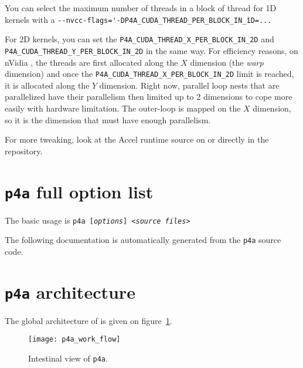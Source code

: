 \documentclass[a4paper]{article}
\begin{document}
You can select the maximum number of threads in a block of thread for 1D
kernels with a \verb|--nvcc-flags='-DP4A_CUDA_THREAD_PER_BLOCK_IN_1D=...|

For 2D kernels, you can set the \verb|P4A_CUDA_THREAD_X_PER_BLOCK_IN_2D|
and \verb|P4A_CUDA_THREAD_Y_PER_BLOCK_IN_2D| in the same way. For
efficiency reasons, on nVidia \Agpu, the threads are first allocated along
the $X$ dimension (the \emph{warp} dimension) and once the
\verb|P4A_CUDA_THREAD_X_PER_BLOCK_IN_2D| limit is reached, it is allocated
along the $Y$ dimension. Right now, parallel loop nests that are
parallelized have their parallelism then limited up to 2 dimensions to
cope more easily with \Acuda \Agpu hardware limitation. The outer-loop is
mapped on the $X$ \Agpu dimension, so it is the dimension that must have
enough parallelism.

For more tweaking, look at the \Apfa Accel runtime source on \url{} or
directly in the \Agit repository.


\section{\protect\texttt{p4a} full option list}
\label{sec:options}

The basic usage is \texttt{p4a [\emph{options}] <\emph{source files}>}

The following documentation is automatically generated from the
\texttt{p4a} source code.



\section{\protect\texttt{p4a} architecture}
\label{sec:p4a-architecture}

The global architecture of \Apfa is given on
figure~\ref{fig:transit_intestinal}.

\begin{figure}
  \texttt{[image: p4a\_work\_flow]}
  \caption{Intestinal view of \texttt{p4a}.}
  \label{fig:transit_intestinal}
\end{figure}
\end{document}
